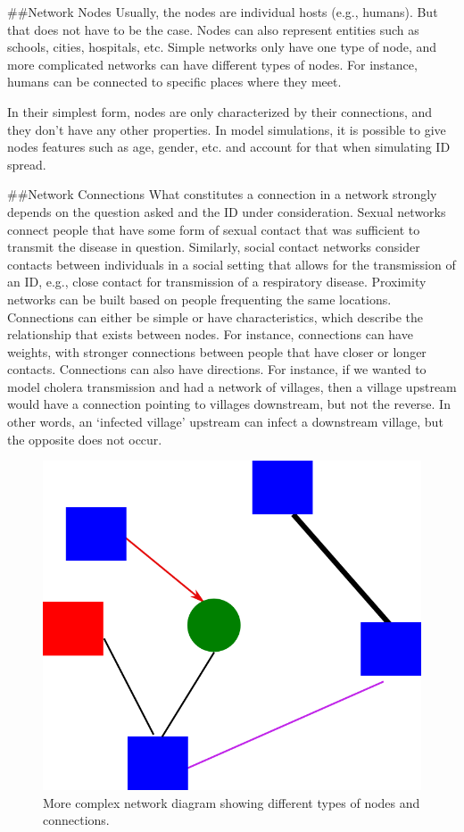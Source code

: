\documentclass[]{book}
\theoremstyle{definition}
\theoremstyle{definition}
\theoremstyle{definition}
\theoremstyle{remark}
\begin{document}
\#\#Network Nodes Usually, the nodes are individual hosts (e.g.,
humans). But that does not have to be the case. Nodes can also represent
entities such as schools, cities, hospitals, etc. Simple networks only
have one type of node, and more complicated networks can have different
types of nodes. For instance, humans can be connected to specific places
where they meet.

In their simplest form, nodes are only characterized by their
connections, and they don't have any other properties. In model
simulations, it is possible to give nodes features such as age, gender,
etc. and account for that when simulating ID spread.

\#\#Network Connections What constitutes a connection in a network
strongly depends on the question asked and the ID under consideration.
Sexual networks connect people that have some form of sexual contact
that was sufficient to transmit the disease in question. Similarly,
social contact networks consider contacts between individuals in a
social setting that allows for the transmission of an ID, e.g., close
contact for transmission of a respiratory disease. Proximity networks
can be built based on people frequenting the same locations. Connections
can either be simple or have characteristics, which describe the
relationship that exists between nodes. For instance, connections can
have weights, with stronger connections between people that have closer
or longer contacts. Connections can also have directions. For instance,
if we wanted to model cholera transmission and had a network of
villages, then a village upstream would have a connection pointing to
villages downstream, but not the reverse. In other words, an `infected
village' upstream can infect a downstream village, but the opposite does
not occur.

\begin{figure}
\centering
\includegraphics{./images/complex-network-diagram.png}
\caption{More complex network diagram showing different types of nodes
and connections.}
\end{figure}
\end{document}

